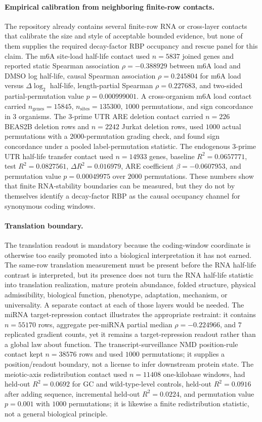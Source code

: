 \paragraph{Empirical calibration from neighboring finite-row contacts.}
The repository already contains several finite-row RNA or cross-layer contacts that calibrate the size and style of acceptable bounded evidence, but none of them supplies the required decay-factor RBP occupancy and rescue panel for this claim.  The m6A site-load half-life contact used $n=5837$ joined genes and reported static Spearman association $\rho=-0.388929$ between m6A load and DMSO log half-life, causal Spearman association $\rho=0.245804$ for m6A load versus $\Delta\log_2$ half-life, length-partial Spearman $\rho=0.227683$, and two-sided partial-permutation value $p=0.000999001$.  A cross-organism m6A load contact carried $n_{\mathrm{genes}}=15845$, $n_{\mathrm{sites}}=135300$, $1000$ permutations, and sign concordance in $3$ organisms.  The 3-prime UTR ARE deletion contact carried $n=226$ BEAS2B deletion rows and $n=2242$ Jurkat deletion rows, used $1000$ actual permutations with a $2000$-permutation grading check, and found sign concordance under a pooled label-permutation statistic.  The endogenous 3-prime UTR half-life transfer contact used $n=14933$ genes, baseline $R^2=0.0657771$, test $R^2=0.0827561$, $\Delta R^2=0.016979$, ARE coefficient $\beta=-0.0607953$, and permutation value $p=0.00049975$ over $2000$ permutations.  These numbers show that finite RNA-stability boundaries can be measured, but they do not by themselves identify a decay-factor RBP as the causal occupancy channel for synonymous coding windows.

\paragraph{Translation boundary.}
The translation readout is mandatory because the coding-window coordinate is otherwise too easily promoted into a biological interpretation it has not earned.  The same-row translation measurement must be present before the RNA half-life contrast is interpreted, but its presence does not turn the RNA half-life statistic into translation realization, mature protein abundance, folded structure, physical admissibility, biological function, phenotype, adaptation, mechanism, or universality.  A separate contact at each of those layers would be needed.  The miRNA target-repression contact illustrates the appropriate restraint: it contains $n=55170$ rows, aggregate per-miRNA partial median $\rho=-0.224966$, and $7$ replicated gradient counts, yet it remains a target-repression readout rather than a global law about function.  The transcript-surveillance NMD position-rule contact kept $n=38576$ rows and used $1000$ permutations; it supplies a position/readout boundary, not a license to infer downstream protein state.  The meiotic-axis redistribution contact used $n=11408$ one-kilobase windows, had held-out $R^2=0.0692$ for GC and wild-type-level controls, held-out $R^2=0.0916$ after adding sequence, incremental held-out $R^2=0.0224$, and permutation value $p=0.001$ with $1000$ permutations; it is likewise a finite redistribution statistic, not a general biological principle.

